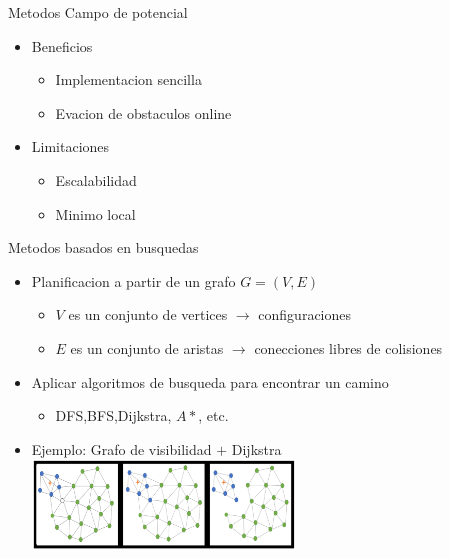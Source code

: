 \documentclass[
	11pt, %
]{beamer}
\begin{document}
\begin{frame}{Metodos Campo de potencial}
  \begin{itemize}
  \item Beneficios\\
    \begin{itemize}
    \item Implementacion sencilla
    \item Evacion de obstaculos online
    \end{itemize}
  \item Limitaciones\\
    \begin{itemize}
    \item Escalabilidad
    \item Minimo local
    \end{itemize}
  \end{itemize}
\end{frame}

\begin{frame}{Metodos basados en busquedas}
  \begin{itemize}
  \item Planificacion a partir de un grafo $G=(V,E)$\\
    \begin{itemize}
    \item $V$ es un conjunto de vertices $\rightarrow$ configuraciones
    \item $E$ es un conjunto de aristas $\rightarrow$ conecciones libres de colisiones
    \end{itemize}
  \item Aplicar algoritmos de busqueda para encontrar un camino\\
    \begin{itemize}
    \item DFS,BFS,Dijkstra, $A*$, etc.
    \end{itemize}
  \item Ejemplo: Grafo de visibilidad $+$ Dijkstra\\
    \centering
    \bigskip %
    \includegraphics[width=7cm]{graph_robot}
  \end{itemize}
\end{frame}
\end{document}
